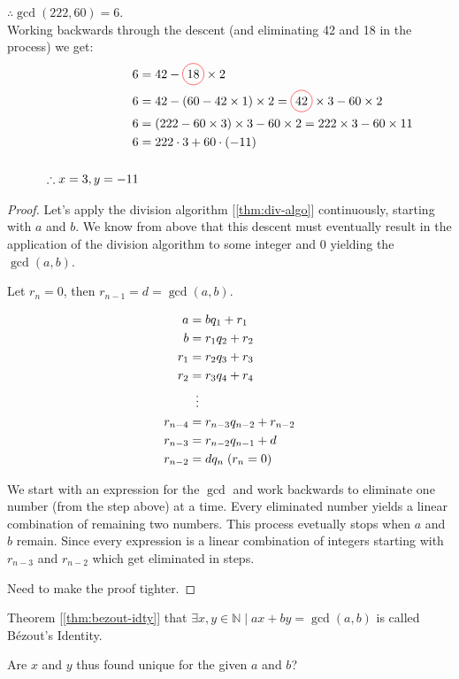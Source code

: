 \documentclass[english,notitlepage,smartquotes]{hgbreport}
\theoremstyle{definition}
\theoremstyle{remark}
\theoremstyle{plain}
\newcommand*\circled[1]{\tikz[baseline=(char.base)]{
    \node[shape=circle,draw=red,inner sep=2pt] (char) {#1};}}
\begin{document}
$\therefore\gcd(222,60)=6$.\\

Working backwards through the descent (and eliminating 42 and 18 in the process) we get:
\begin{align*}
6&=42-\circled{18}\times 2\\
6&=42-(60-42\times 1)\times 2=\circled{42}\times 3-60\times 2\\
6&=(222-60\times 3)\times 3-60\times 2=222\times 3-60\times 11\\
6&=222\cdot 3+60\cdot(-11)\\
\\
\therefore x=3,y=-11
\end{align*}



\begin{proof}
Let's apply the division algorithm [\ref{thm:div-algo}] continuously, starting with $a$ and $b$. We know from above that this descent must eventually result in the application of the division algorithm to some integer and 0 yielding the $\gcd(a,b)$.

Let $r_n=0$, then $r_{n-1}=d=\gcd(a,b)$.

\begin{align*}
a&=bq_1+r_1\\
b&=r_1q_2+r_2\\
r_1&=r_2q_3+r_3\\
r_2&=r_3q_4+r_4\\
&\;\;\vdots \notag \\
r_{n-4}&=r_{n-3}q_{n-2}+r_{n-2}\\
r_{n-3}&=r_{n-2}q_{n-1}+d\\
r_{n-2}&=dq_n\;(r_n=0)
\end{align*}

We start with an expression for the $\gcd$ and work backwards to eliminate one number (from the step above) at a time. Every eliminated number yields a linear combination of remaining two numbers. This process evetually stops when $a$ and $b$ remain. Since every expression is a linear combination of integers starting with $r_{n-3}$ and $r_{n-2}$ which get eliminated in steps.

\colorbox{BurntOrange}{Need to make the proof tighter.}
\end{proof}

Theorem [\ref{thm:bezout-idty}] that $\exists x,y\in\mathbb{N}\mid ax+by=\gcd(a,b)$ is called B\'ezout's Identity. 

Are $x$ and $y$ thus found unique for the given $a$ and $b$?\\
\end{document}
